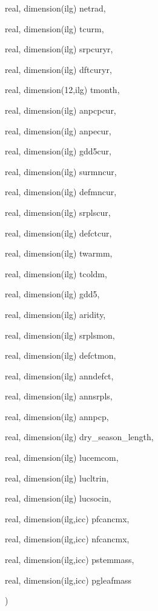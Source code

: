 {\begin{DoxyParamCaption}
\item[{real, dimension(ilg)}]{netrad, }
\item[{real, dimension(ilg)}]{tcurm, }
\item[{real, dimension(ilg)}]{srpcuryr, }
\item[{real, dimension(ilg)}]{dftcuryr, }
\item[{real, dimension(12,ilg)}]{tmonth, }
\item[{real, dimension(ilg)}]{anpcpcur, }
\item[{real, dimension(ilg)}]{anpecur, }
\item[{real, dimension(ilg)}]{gdd5cur, }
\item[{real, dimension(ilg)}]{surmncur, }
\item[{real, dimension(ilg)}]{defmncur, }
\item[{real, dimension(ilg)}]{srplscur, }
\item[{real, dimension(ilg)}]{defctcur, }
\item[{real, dimension(ilg)}]{twarmm, }
\item[{real, dimension(ilg)}]{tcoldm, }
\item[{real, dimension(ilg)}]{gdd5, }
\item[{real, dimension(ilg)}]{aridity, }
\item[{real, dimension(ilg)}]{srplsmon, }
\item[{real, dimension(ilg)}]{defctmon, }
\item[{real, dimension(ilg)}]{anndefct, }
\item[{real, dimension(ilg)}]{annsrpls, }
\item[{real, dimension(ilg)}]{annpcp, }
\item[{real, dimension(ilg)}]{dry\+\_\+season\+\_\+length, }
\item[{real, dimension(ilg)}]{lucemcom, }
\item[{real, dimension(ilg)}]{lucltrin, }
\item[{real, dimension(ilg)}]{lucsocin, }
\item[{real, dimension(ilg,icc)}]{pfcancmx, }
\item[{real, dimension(ilg,icc)}]{nfcancmx, }
\item[{real, dimension(ilg,icc)}]{pstemmass, }
\item[{real, dimension(ilg,icc)}]{pgleafmass}
\end{DoxyParamCaption}
)}\label{competition__map_8f_a854a6eedf534eff4dd50075b3a321744}


